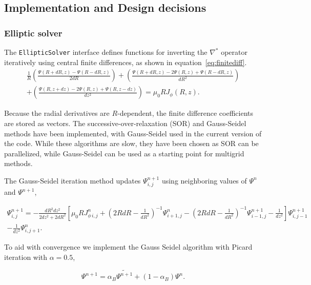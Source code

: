 \documentclass[paper=letter, fontsize=11pt]{scrartcl} %
\begin{document}
\restoregeometry

\subsection{Implementation and Design decisions}

\subsubsection{Elliptic solver}
The \texttt{EllipticSolver} interface defines functions for inverting the $\nabla^*$ operator iteratively using central finite differences, as shown in equation~\ref{eq:finitediff}.
\begin{multline} \label{eq:finitediff}
\frac{1}{R} \left(\frac{\Psi(R + dR, z) - \Psi(R - dR, z)}{2dR} \right) + \left( \frac{\Psi (R + dR, z) - 2\Psi(R,z) + \Psi(R-dR, z)}{dR^2} \right) \\ + \left(\frac{\Psi(R, z + dz) - 2\Psi(R,z)  + \Psi(R, z-dz)}{dz^2}\right) = \mu_0 R J_{\phi}(R,z). 
\end{multline}

Because the radial derivatives are $R$-dependent, the finite difference coefficients are stored as vectors. The successive-over-relaxation (SOR) and Gauss-Seidel methods have been implemented, with Gauss-Seidel used in the current version of the code. While these algorithms are slow, they have been chosen as SOR can be parallelized, while Gauss-Seidel can be used as a starting point for multigrid methods. 

The Gauss-Seidel iteration method updates $\Psi^{n+1}_{i,j}$ using neighboring values of $\Psi^{n}$ and $\Psi^{n+1}$, 

\begin{multline} \label{eq:gaussseidel}
\Psi^{n+1}_{i,j} = -\frac{dR^2 dz^2}{2dz^2 + 2dR^2} \left[ \mu_0 R J^n_{\phi \, i, j} + \left(2 R dR - \frac{1}{dR^2}\right)^{-1} \Psi^{n}_{i+1,j} - \left(2 R dR - \frac{1}{dR^2}\right)^{-1} \Psi^{n+1}_{i-1,j} - \frac{1}{dz^2} \right] \Psi^{n+1}_{i,j-1} \\ - \frac{1}{dz^2}\Psi^n_{i, j+1}. 
\end{multline}

To aid with convergence we implement the Gauss Seidel algorithm with Picard iteration with $\alpha = 0.5$, 

\begin{equation} \label{eq:picard}
\Psi^{n+1} = \alpha_B \widetilde{\Psi^{n+1}} + (1 - \alpha_{B}) \Psi^n. 
\end{equation}
\end{document}
